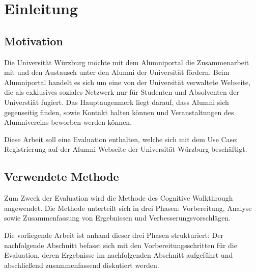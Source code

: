﻿\section{Einleitung}
\subsection{Motivation}
Die Universität Würzburg möchte mit dem Alumniportal die Zusammenarbeit mit und den Austausch unter den Alumni der Universität fördern. 
Beim Alumniportal handelt es sich um eine von der Universität verwaltete Webseite, die als exklusives soziales Netzwerk nur für Studenten und Absolventen der Universtiät fugiert. 
Das Hauptaugenmerk liegt darauf, dass Alumni sich gegenseitig finden, sowie Kontakt halten können und Veranstaltungen des Alumnivereins beworben werden können. 

Diese Arbeit soll eine Evaluation enthalten, welche sich mit dem Use Case: Registrierung auf der Alumni Webseite der Universität Würzburg beschäftigt. 

\subsection{Verwendete Methode}
Zum Zweck der Evaluation wird die Methode des Cognitive Walkthrough angewendet.
Die Methode unterteilt sich in drei Phasen: Vorbereitung, Analyse sowie Zusammenfassung von Ergebnissen und Verbesserungsvorschlägen.

Die vorliegende Arbeit ist anhand dieser drei Phasen strukturiert: Der nachfolgende
Abschnitt befasst sich mit den Vorbereitungsschritten für die Evaluation, deren Ergebnisse im nachfolgenden Abschnitt aufgeführt und abschließend zusammenfassend diskutiert werden.